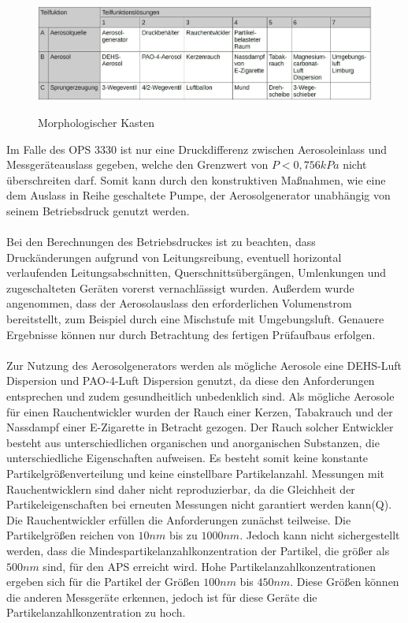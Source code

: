 \begin{figure}[H]
        \myfloatalign
        {\includegraphics[width=.9\linewidth]{gfx/concepts/Morph.jpg}} \quad
        \caption[Morphologischer Kasten]
        {Morphologischer Kasten}
        \label{fig:Morph}
\end{figure}
Im Falle des OPS 3330 ist nur eine Druckdifferenz zwischen Aerosoleinlass und Messger\"{a}teauslass gegeben, welche den Grenzwert von \(P < 0,756 kPa\) nicht \"{u}berschreiten darf. Somit kann durch den konstruktiven Ma{\ss}nahmen, wie eine dem Auslass in Reihe geschaltete Pumpe, der Aerosolgenerator unabh\"{a}ngig von seinem Betriebsdruck genutzt werden.
\\\\
Bei den Berechnungen des Betriebsdruckes ist zu beachten, dass Druck\"{a}nderungen aufgrund von Leitungsreibung, eventuell horizontal verlaufenden Leitungsabschnitten, Querschnitts\"{u}berg\"{a}ngen, Umlenkungen und zugeschalteten Ger\"{a}ten vorerst vernachl\"{a}ssigt wurden. Au{\ss}erdem wurde angenommen, dass der Aerosolauslass den erforderlichen Volumenstrom bereitstellt, zum Beispiel durch eine Mischstufe mit Umgebungsluft. Genauere Ergebnisse k\"{o}nnen nur durch Betrachtung des fertigen Pr\"{u}faufbaus erfolgen.
\\\\
Zur Nutzung des Aerosolgenerators werden als m\"{o}gliche Aerosole eine DEHS-Luft Dispersion und PAO-4-Luft Dispersion genutzt, da diese den Anforderungen entsprechen und zudem gesundheitlich unbedenklich sind. Als m\"{o}gliche Aerosole f\"{u}r einen Rauchentwickler wurden der Rauch einer Kerzen, Tabakrauch und der Nassdampf einer E-Zigarette in Betracht gezogen. Der Rauch solcher Entwickler besteht aus unterschiedlichen organischen und anorganischen Substanzen, die unterschiedliche Eigenschaften aufweisen. Es besteht somit keine konstante Partikelgr\"{o}{\ss}enverteilung und keine einstellbare Partikelanzahl. Messungen mit Rauchentwicklern sind daher nicht reproduzierbar, da die Gleichheit der Partikeleigenschaften bei erneuten Messungen nicht garantiert werden kann(Q). Die Rauchentwickler erf\"{u}llen die Anforderungen zun\"{a}chst teilweise. Die Partikelgr\"{o}{\ss}en reichen von \(10 nm\) bis zu \(1000 nm\). Jedoch kann nicht sichergestellt werden, dass die Mindespartikelanzahlkonzentration der Partikel, die gr\"{o}{\ss}er als \(500 nm\) sind, f\"{u}r den APS erreicht wird. Hohe Partikelanzahlkonzentrationen ergeben sich f\"{u}r die Partikel der Gr\"{o}{\ss}en \(100 nm\) bis \(450 nm\). Diese Gr\"{o}{\ss}en k\"{o}nnen die anderen Messger\"{a}te erkennen, jedoch ist f\"{u}r diese Ger\"{a}te die Partikelanzahlkonzentration zu hoch.
